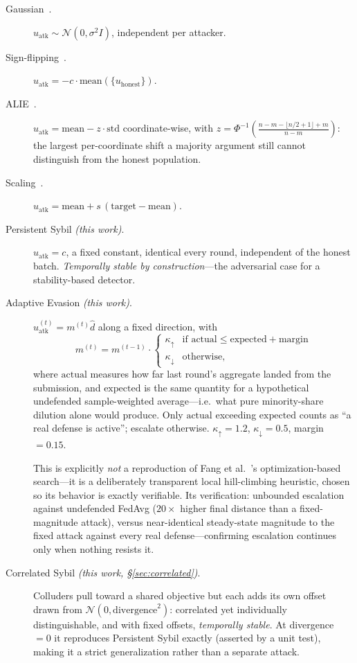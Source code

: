 \documentclass[11pt,a4paper]{article}
\begin{document}
\begin{description}
  \item[Gaussian~\cite{blanchard2017}.]
    $u_{\text{atk}} \sim \mathcal{N}(0, \sigma^2 I)$, independent per attacker.
  \item[Sign-flipping~\cite{li2019}.]
    $u_{\text{atk}} = -c \cdot \mathrm{mean}(\{u_{\text{honest}}\})$.
  \item[ALIE~\cite{baruch2019}.]
    $u_{\text{atk}} = \mathrm{mean} - z \cdot \mathrm{std}$
    coordinate-wise, with
    $z = \Phi^{-1}\!\left(\frac{n-m-\lfloor n/2+1\rfloor+m}{n-m}\right)$:
    the largest per-coordinate shift a majority argument still cannot
    distinguish from the honest population.
  \item[Scaling~\cite{bagdasaryan2020}.]
    $u_{\text{atk}} = \mathrm{mean} + s\,(\text{target} - \mathrm{mean})$.
  \item[Persistent Sybil \emph{(this work)}.]
    $u_{\text{atk}} = c$, a fixed constant, identical every round,
    independent of the honest batch. \emph{Temporally stable by
    construction}---the adversarial case for a stability-based detector.
  \item[Adaptive Evasion \emph{(this work)}.]
    $u_{\text{atk}}^{(t)} = m^{(t)} \hat d$ along a fixed direction, with
    \[
      m^{(t)} = m^{(t-1)} \cdot
      \begin{cases}
        \kappa_{\uparrow} & \text{if } \mathrm{actual} \leq \mathrm{expected} + \text{margin}\\
        \kappa_{\downarrow} & \text{otherwise,}
      \end{cases}
    \]
    where $\mathrm{actual}$ measures how far last round's aggregate landed
    from the submission, and $\mathrm{expected}$ is the same quantity for a
    hypothetical undefended sample-weighted average---i.e.\ what pure
    minority-share dilution alone would produce. Only $\mathrm{actual}$
    exceeding $\mathrm{expected}$ counts as ``a real defense is active'';
    escalate otherwise. $\kappa_{\uparrow}=1.2$,
    $\kappa_{\downarrow}=0.5$, margin $=0.15$.

    This is explicitly \emph{not} a reproduction of Fang et
    al.~\cite{fang2020}'s optimization-based search---it is a deliberately
    transparent local hill-climbing heuristic, chosen so its behavior is
    exactly verifiable. Its verification: unbounded escalation against
    undefended FedAvg ($20\times$ higher final distance than a
    fixed-magnitude attack), versus near-identical steady-state magnitude
    to the fixed attack against every real defense---confirming escalation
    continues only when nothing resists it.

  \item[Correlated Sybil \emph{(this work, \S\ref{sec:correlated})}.]
    Colluders pull toward a shared objective but each adds its own offset
    drawn from $\mathcal{N}(0, \text{divergence}^2)$: correlated yet
    individually distinguishable, and with fixed offsets, \emph{temporally
    stable}. At divergence $=0$ it reproduces Persistent Sybil exactly
    (asserted by a unit test), making it a strict generalization rather
    than a separate attack.
\end{description}
\end{document}
